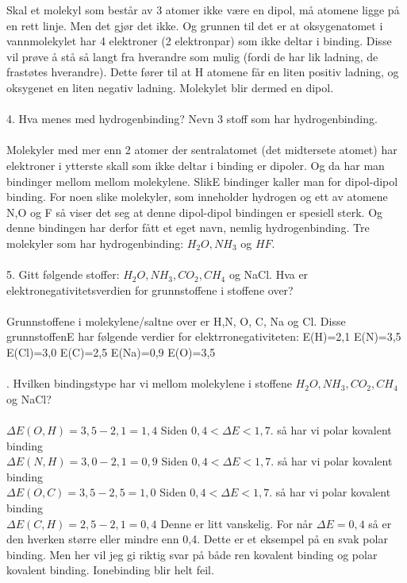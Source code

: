 \documentclass[12pt,a4paper]{article}
\begin{document}
Skal et molekyl som består av 3 atomer ikke være en dipol, må atomene ligge på en rett linje.  Men det gjør det ikke.  Og grunnen til det er at oksygenatomet i vannmolekylet har 4 elektroner (2 elektronpar) som ikke deltar i binding.  Disse vil prøve å stå så langt fra hverandre som mulig (fordi de har lik ladning, de frastøtes hverandre).   Dette fører til at H atomene får en liten positiv ladning, og oksygenet en liten negativ ladning.  Molekylet blir dermed en dipol.\\\\
4.	Hva menes med hydrogenbinding?  Nevn 3 stoff som har hydrogenbinding.\\\\
Molekyler med mer enn 2 atomer der sentralatomet (det midtersete atomet) har elektroner i ytterste skall som ikke deltar i binding er dipoler.  Og da har man bindinger mellom mellom molekylene.  SlikE bindinger kaller man for dipol-dipol binding.  For noen slike molekyler, som inneholder hydrogen og ett av atomene N,O og F så viser det seg at denne dipol-dipol bindingen er spesiell sterk.  Og denne bindingen har derfor fått et eget navn, nemlig hydrogenbinding.  Tre molekyler som har hydrogenbinding: $H_2O, NH_3$ og $HF$.        \\\\
5.	 Gitt følgende stoffer: $H_2O, NH_3, CO_2,CH_4$ og NaCl.
Hva er elektronegativitetsverdien for grunnstoffene i stoffene over?\\\\
Grunnstoffene i molekylene/saltne over er  H,N, O, C, Na og Cl. Disse grunnstoffenE har følgende verdier for elektrronegativiteten:  E(H)=2,1  E(N)=3,5 E(Cl)=3,0 E(C)=2,5 E(Na)=0,9 E(O)=3,5 \\\\.	Hvilken bindingstype har vi mellom molekylene i stoffene $H_2O, NH_3, CO_2,CH_4$ og NaCl?\\\\
$\Delta E(O,H)=3,5-2,1=1,4$  Siden $0,4<\Delta E<1,7.$ så har vi polar kovalent binding \\
$\Delta E(N,H)=3,0-2,1=0,9$  Siden $0,4<\Delta E<1,7.$ så har vi polar kovalent binding\\
$\Delta E(O,C)=3,5-2,5=1,0$  Siden $0,4<\Delta E<1,7.$ så har vi polar kovalent binding\\
$\Delta E(C,H)=2,5-2,1=0,4$  Denne er litt vanskelig.  For når $\Delta E=0,4$ så er den hverken større eller mindre enn 0,4.  Dette er et eksempel på en svak polar binding.  Men her vil jeg gi riktig svar på både ren kovalent binding og polar kovalent binding.  Ionebinding blir helt feil. \\
\end{document}
